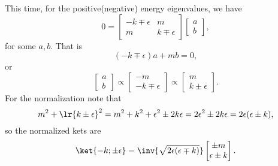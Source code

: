 This time, for the positive(negative) energy eigenvalues, we have
%
\begin{dmath}\label{eqn:gradQuantumProblemSet4Problem3:141}
0
=
\begin{bmatrix}
-k \mp \epsilon & m \\
m & k \mp \epsilon
\end{bmatrix}
\begin{bmatrix}
a \\
b
\end{bmatrix},
\end{dmath}
%
for some \( a, b\).  That is
%
\begin{equation}\label{eqn:gradQuantumProblemSet4Problem3:161}
(-k \mp \epsilon) a + m b = 0,
\end{equation}
%
or
%
\begin{dmath}\label{eqn:gradQuantumProblemSet4Problem3:181}
\begin{bmatrix}
a \\
b
\end{bmatrix}
\propto
\begin{bmatrix}
- m \\
-k \mp \epsilon
\end{bmatrix}
\propto
\begin{bmatrix}
m \\
k \pm \epsilon
\end{bmatrix}.
\end{dmath}
%
For the normalization note that
%
\begin{dmath}\label{eqn:gradQuantumProblemSet4Problem3:201}
m^2 + \lr{ k \pm \epsilon }^2
=
m^2 + k^2 + \epsilon^2 \pm 2 k \epsilon
=
2 \epsilon^2 \pm 2 k \epsilon
=
2 \epsilon (\epsilon \pm k),
\end{dmath}
%
so the normalized kets are
%
\begin{dmath}\label{eqn:gradQuantumProblemSet4Problem3:221}
\ket{-k; \pm\epsilon} =
\inv{\sqrt{2 \epsilon(\epsilon \mp k)}}
\begin{bmatrix}
\pm m \\
\epsilon \pm k
\end{bmatrix}.
\end{dmath}
%
